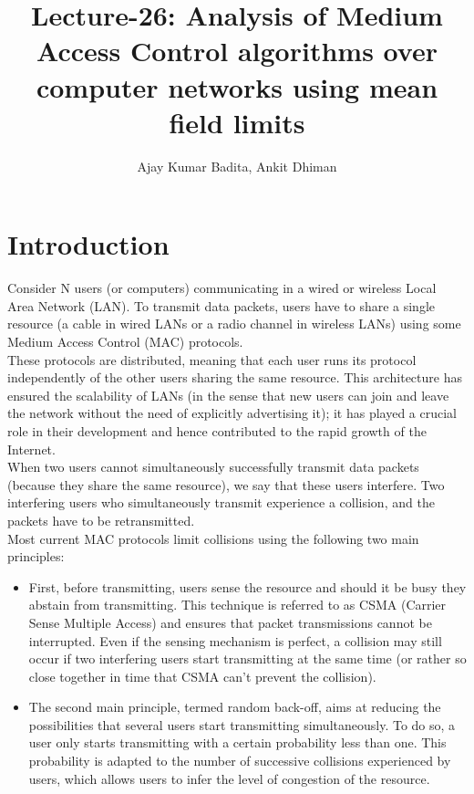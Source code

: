 \documentclass[letterpaper,english,10pt]{article}
\title{Lecture-26: Analysis of Medium Access Control algorithms over computer networks using mean field limits}
\author{Ajay Kumar Badita, Ankit Dhiman}
\begin{document}
\maketitle
\section{Introduction}

Consider N users (or computers) communicating in a wired or wireless Local Area Network (LAN). To transmit data packets, users have to share a single resource (a cable in wired LANs or a radio channel in wireless LANs) using some Medium Access Control (MAC) protocols. \\

These protocols are distributed, meaning that each user runs its protocol independently of the other users sharing the same resource. This architecture has ensured the scalability of LANs (in the sense that new users can join and leave the network without the need of explicitly advertising it); it has played a crucial role in their development and hence contributed to the rapid growth of the Internet.\\

When two users cannot simultaneously successfully transmit data packets (because they share the same resource), we say that these users interfere. Two interfering users who simultaneously transmit experience a collision, and the packets have to be retransmitted. \\

Most current MAC protocols limit collisions using the following two main principles:

\begin{itemize}

\item First, before transmitting, users sense the resource and should it be busy they abstain from transmitting. This technique is referred to as CSMA (Carrier Sense Multiple Access) and ensures that packet transmissions cannot be interrupted. Even if the sensing mechanism is perfect, a collision may still occur if two interfering users start transmitting at the same time (or rather so close together in time that CSMA can’t prevent the collision). 

\item  The second main principle, termed random back-off, aims at reducing the possibilities that several users start transmitting simultaneously. To do so, a user only starts transmitting with a certain probability less than one. This probability is adapted to the number of successive collisions experienced by users, which allows users to infer the level of congestion of the resource.\\

\end{itemize}
\end{document}
